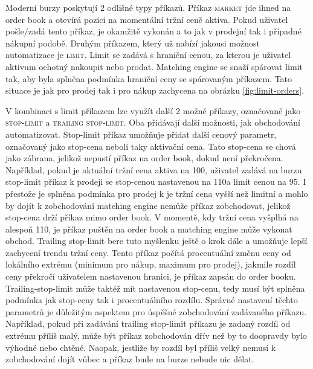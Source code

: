 Moderní burzy poskytují 2 odlišné typy příkazů. Příkaz \textsc{market} jde ihned na order book a otevírá pozici na momentální tržní ceně aktiva. Pokud uživatel
pošle/zadá tento příkaz, je okamžitě vykonán a to jak v prodejní tak i případné nákupní podobě. Druhým příkazem, který už nabízí jakousi možnost automatizace
je \textsc{limit}.
Limit se zadává s hraniční cenou, za kterou je uživatel aktivum ochotný nakoupit nebo prodat. Matching engine se snaží spárovat limit tak, aby byla splněna podmínka
hraniční ceny se spárovaným příkazem. Tato situace je jak pro prodej tak i pro nákup zachycena na obrázku \ref{fig:limit-orders}.

V kombinaci s limit příkazem lze využít další 2 možné příkazy, označované jako \textsc{stop-limit} a \textsc{trailing stop-limit}. Oba přidávají další možnosti,
jak obchodování automatizovat. Stop-limit příkaz umožňuje přidat další cenový parametr, označovaný jako stop-cena neboli taky aktivační cena.
Tato stop-cena se chová jako zábrana, jelikož nepustí příkaz na order book, dokud není překročena. Například, pokud je aktuální tržní cena aktiva na 100\texteuro, uživatel zadává na burzu stop-limit příkaz k
prodeji se stop-cenou nastavenou na 110\texteuro a limit cenou na 95\texteuro. I přestože je splněna podmínka pro prodej k je tržní cena vyšší než limitní
a mohlo by dojít k zobchodování matching engine nemůže příkaz zobchodovat, jelikož stop-cena drží příkaz mimo order book. V momentě, kdy tržní cena vyšplhá na
alespoň 110\texteuro, je příkaz puštěn na order book a matching engine může vykonat obchod. %
Trailing stop-limit bere tuto myšlenku ještě o krok dále a umožňuje lepší zachycení trendu tržní ceny. Tento příkaz počítá procentuální změnu ceny od lokálního
extrému (minimum pro nákup, maximum pro prodej), jakmile rozdíl ceny překročí uživatelem nastavenou hranici, je příkaz zapsán do order booku. Trailing-stop-limit
může taktéž mít nastavenou stop-cenu, tedy musí být splněna podmínka jak stop-ceny tak i procentuálního rozdílu.  %
Správné nastavení těchto parametrů je důležitým aspektem pro úspěšné zobchodování zadávaného příkazu. Například, pokud při zadávání trailing stop-limit příkazu
je zadaný rozdíl od extrému příliš malý, může být příkaz zobchodován dřív než by to doopravdy bylo výhodné nebo chtěné. Naopak, jestliže by rozdíl byl příliš velký
nemusí k zobchodování dojít vůbec a příkaz bude na burze nebude nic dělat.


